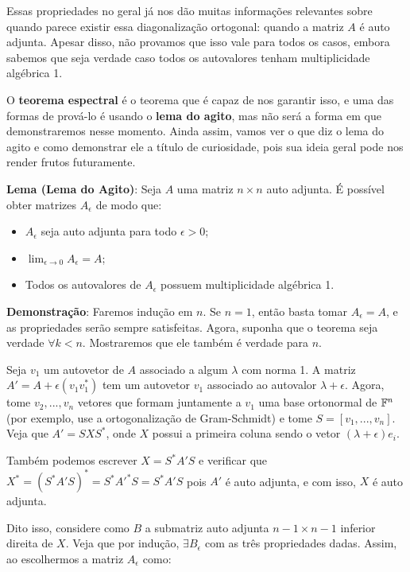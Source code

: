 \documentclass[11pt, a4paper]{article}
\begin{document}
Essas propriedades no geral já nos dão muitas informações relevantes sobre quando parece existir essa diagonalização ortogonal: quando a matriz \(A\) é auto adjunta. Apesar disso, não provamos que isso vale para todos os casos, embora sabemos que seja verdade caso todos os autovalores tenham multiplicidade algébrica 1.

O \textbf{teorema espectral} é o teorema que é capaz de nos garantir isso, e uma das formas de prová-lo é usando o \textbf{lema do agito}, mas não será a forma em que demonstraremos nesse momento. Ainda assim, vamos ver o que diz o lema do agito e como demonstrar ele a título de curiosidade, pois sua ideia geral pode nos render frutos futuramente.

\textbf{Lema (Lema do Agito)}: Seja \(A\) uma matriz \(n \times n\) auto adjunta. É possível obter matrizes \(A_\epsilon\) de modo que:

\void[-0.2]

\begin{itemize}
    \item \(A_{\epsilon}\) seja auto adjunta para todo \(\epsilon>0\);
    \item \(\displaystyle \lim_{\epsilon \rightarrow 0}{A_{\epsilon}}=A\);
    \item Todos os autovalores de \(A_{\epsilon}\) possuem multiplicidade algébrica 1.
\end{itemize}

\textbf{Demonstração}: Faremos indução em \(n\). Se \(n=1\), então basta tomar \(A_\epsilon=A\), e as propriedades serão sempre satisfeitas. Agora, suponha que o teorema seja verdade \(\forall k<n\). Mostraremos que ele também é verdade para \(n\).

Seja \(v_1\) um autovetor de \(A\) associado a algum \(\lambda\) com norma 1. A matriz \(A'=A+\epsilon (v_1v_1^*)\) tem um autovetor \(v_1\) associado ao autovalor \(\lambda + \epsilon\). Agora, tome \(v_2,...,v_n\) vetores que formam juntamente a \(v_1\) uma base ortonormal de \(\mathbb{F}^{n}\) (por exemplo, use a ortogonalização de Gram-Schmidt) e tome \(S=[v_1,...,v_n]\). Veja que \(A'=SXS^*\), onde \(X\) possui a primeira coluna sendo o vetor \((\lambda+\epsilon)e_i\). 

Também podemos escrever \(X=S^*A'S\) e verificar que \(X^* = (S^*A'S)^*=S^*A'^*S=S^*A'S\) pois \(A'\) é auto adjunta, e com isso, \(X\) é auto adjunta. 

Dito isso, considere como \(B\) a submatriz auto adjunta \(n-1\times n-1\) inferior direita de \(X\). Veja que por indução, \(\exists B_{\epsilon}\) com as três propriedades dadas. Assim, ao escolhermos a matriz \(A_{\epsilon}\) como:
\end{document}
